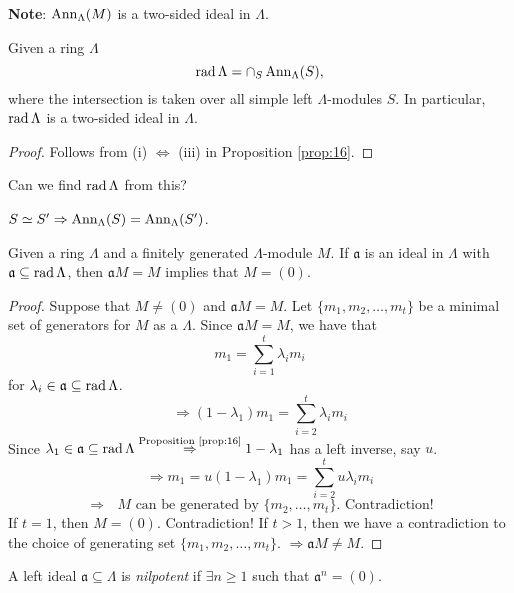 \textbf{Note}: $\operatorname{Ann}\nolimits_\Lambda(M)$ is a two-sided ideal in $\Lambda$. 

\begin{cor}
Given a ring $\Lambda$
\[\operatorname{rad}\nolimits\Lambda = \cap_{S} \operatorname{Ann}\nolimits_\Lambda(S),\]
where the intersection is taken over all simple left $\Lambda$-modules
$S$.  In particular, $\operatorname{rad}\nolimits\Lambda$ is a two-sided ideal in $\Lambda$. 
\end{cor}
\begin{proof}
Follows from (i) $\Leftrightarrow$ (iii) in Proposition
\ref{prop:16}. 
\end{proof}

Can we find $\operatorname{rad}\nolimits\Lambda$ from this?

$S\simeq S' \Rightarrow \operatorname{Ann}\nolimits_\Lambda(S) = \operatorname{Ann}\nolimits_\Lambda(S')$. 

\begin{thm}\label{thm:18}
Given a ring $\Lambda$ and a finitely generated $\Lambda$-module $M$.
If $\mathfrak{a}$ is an ideal in $\Lambda$ with $\mathfrak{a}\subseteq
\operatorname{rad}\nolimits\Lambda$, then $\mathfrak{a} M = M$ implies that $M = (0)$. 
\end{thm}
\begin{proof}
Suppose that $M\neq (0)$ and $\mathfrak{a}M = M$.  Let
$\{m_1,m_2,\ldots,m_t\}$ be a minimal set of generators for $M$ as a
$\Lambda$.  Since $\mathfrak{a}M=M$, we have that 
\[m_1 = \sum_{i=1}^t \lambda_im_i\]
for $\lambda_i\in\mathfrak{a}\subseteq \operatorname{rad}\nolimits\Lambda$. 
\[\Rightarrow (1 - \lambda_1)m_1 = \sum_{i=2}^t \lambda_im_i\]
Since $\lambda_1\in\mathfrak{a}\subseteq \operatorname{rad}\nolimits\Lambda
\stackrel{\textrm{Proposition \ref{prop:16}}}{\Rightarrow} 1 -
\lambda_1$ has a left inverse, say $u$.
\[\Rightarrow m_1 = u(1 - \lambda_1) m_1 = \sum_{i=2}^t
  u\lambda_im_i\]
\[\Rightarrow \text{\ $M$ can be generated by $\{m_2,\ldots,m_t\}$.  Contradiction!}\]
If $t=1$, then $M = (0)$.  Contradiction!  If $t > 1$, then we have a
contradiction to the choice of generating set
$\{m_1,m_2,\ldots,m_t\}$. $\Rightarrow \mathfrak{a} M \neq M$. 
\end{proof}

\begin{recall}
A left ideal $\mathfrak{a}\subseteq \Lambda$ is
\emph{nilpotent} if
$\exists n \geq 1$ such that $\mathfrak{a}^n = (0)$. 
\end{recall}

